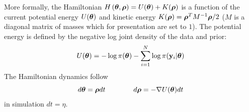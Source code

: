 \documentclass[]{article}
\begin{document}
More formally, the Hamiltonian $H\left({\bm \theta}, {\bm \rho} \right) = U({\bm \theta}) + K({\bm \rho})$ is a function of the current potential energy $U({\bm \theta})$ and kinetic energy $K({\bm \rho}) = {\bm \rho}^T M^{-1}{\bm \rho}/2$ ($M$ is a diagonal matrix of masses which for presentation are set to $1$).  The potential energy is defined by the negative log joint density of the data and prior:
\begin{equation}
  U({\bm \theta}) = - \log \pi({\bm \theta}) - \sum_{i=1}^N \log \pi({\bf y}_i | {\bm \theta} )
\end{equation}
The Hamiltonian dynamics follow 
\begin{equation}
  d{\bm \theta} = {\bm \rho} dt ~~~~~~~~~~~~ d{\bm \rho} = -\nabla U({\bm \theta}) dt
\end{equation}
in simulation $dt = \eta$. 



\end{document}
